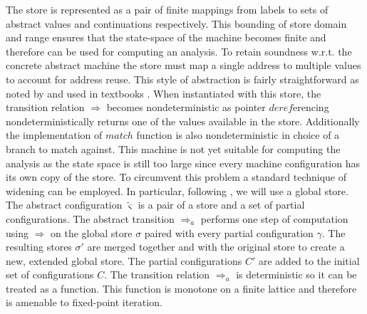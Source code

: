 The store is represented as a pair of finite mappings from labels to sets of abstract values and continuations respectively.
This bounding of store domain and range ensures that the state-space of the machine becomes finite and therefore can be used for computing an analysis.
To retain soundness w.r.t. the concrete abstract machine the store must map a single address to multiple values to account for address reuse.
This style of abstraction is fairly straightforward as noted by \cite{aam} and used in textbooks \cite{popa}.
When instantiated with this store, the transition relation $\Rightarrow$ becomes nondeterministic as pointer $\mathit{deref}$erencing nondeterministically returns one of the values available in the store.
Additionally the implementation of $\mathit{match}$ function is also nondeterministic in choice of a branch to match against.
This machine is not yet suitable for computing the analysis as the state space is still too large since every machine configuration has its own copy of the store.
To circumvent this problem a standard technique of widening \cite{popa} can be employed.
In particular, following \cite{aam}, we will use a global store.
The abstract configuration $\tilde{\varsigma}$ is a pair of a store and a set of partial configurations.
The abstract transition $\Rightarrow_a$ performs one step of computation using $\Rightarrow$ on the global store $\sigma$ paired with every partial configuration $\gamma$.
The resulting stores $\sigma'$ are merged together and with the original store to create a new, extended global store.
The partial configurations $C'$ are added to the initial set of configurations $C$.
The transition relation $\Rightarrow_a$ is deterministic so it can be treated as a function.
This function is monotone on a finite lattice and therefore is amenable to fixed-point iteration.

